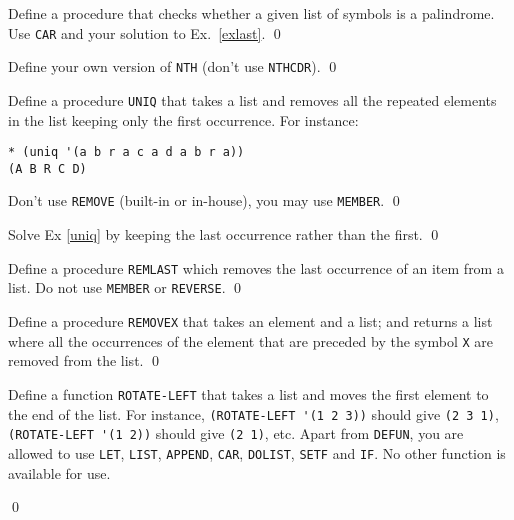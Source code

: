 \documentclass[a4paper,11pt]{article}
\begin{document}
\begin{uexercise}
Define a procedure that checks whether a given list of symbols is a palindrome. Use \Verb+CAR+ and your solution to Ex.\ \ref{exlast}.
\qed
\end{uexercise}

\begin{uexercise}
Define your own version of \Verb+NTH+ (don't use \Verb+NTHCDR+).
\qed
\end{uexercise}


\begin{uexercise}
\label{uniq}
Define a procedure \Verb+UNIQ+ that takes a list and removes all the repeated elements in the list keeping only the first occurrence. For instance:

\begin{Verbatim}
* (uniq '(a b r a c a d a b r a))
(A B R C D)
\end{Verbatim}

Don't use \Verb+REMOVE+ (built-in or in-house), you may use \Verb+MEMBER+.
\qed
\end{uexercise}

\begin{uexercise}
Solve Ex \ref{uniq} by keeping the last occurrence rather than the first.
\qed
\end{uexercise}

\begin{uexercise}
Define a procedure \Verb+REMLAST+ which removes the last occurrence of an item from a list. Do not use \Verb+MEMBER+ or \Verb+REVERSE+.
\qed
\end{uexercise}

\begin{uexercise}

Define a procedure \Verb+REMOVEX+  that takes an element and a list; and returns a list where all the occurrences of the element that are preceded by the symbol \Verb+X+ are removed from the list.
\qed
\end{uexercise}

\begin{uexercise}
Define a function \Verb+ROTATE-LEFT+ that takes a list and moves the first element to the end of the list. For instance, \Verb+(ROTATE-LEFT '(1 2 3))+ should give \Verb+(2 3 1)+, \Verb+(ROTATE-LEFT '(1 2))+ should give \Verb+(2 1)+, etc. Apart from \Verb+DEFUN+, you are allowed to use \Verb+LET+, \Verb+LIST+, \Verb+APPEND+, \Verb+CAR+, \Verb+DOLIST+, \Verb+SETF+ and \Verb+IF+. No other function is available for use.

\qed
\end{uexercise}
\end{document}
